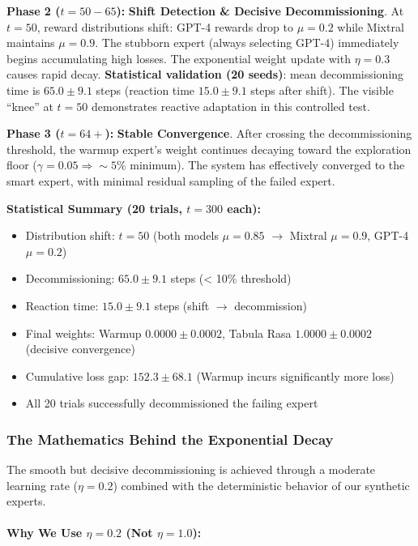 \textbf{Phase 2 ($t=50-65$):} \textbf{Shift Detection \& Decisive Decommissioning}. At $t=50$, reward distributions shift: GPT-4 rewards drop to $\mu=0.2$ while Mixtral maintains $\mu=0.9$. The stubborn expert (always selecting GPT-4) immediately begins accumulating high losses. The exponential weight update with $\eta=0.3$ causes rapid decay. \textbf{Statistical validation (20 seeds)}: mean decommissioning time is $65.0 \pm 9.1$ steps (reaction time $15.0 \pm 9.1$ steps after shift). The visible ``knee'' at $t=50$ demonstrates reactive adaptation in this controlled test.

\textbf{Phase 3 ($t=64+$):} \textbf{Stable Convergence}. After crossing the decommissioning threshold, the warmup expert's weight continues decaying toward the exploration floor ($\gamma=0.05 \Rightarrow \sim 5\%$ minimum). The system has effectively converged to the smart expert, with minimal residual sampling of the failed expert.

\textbf{Statistical Summary (20 trials, $t=300$ each):}
\begin{itemize}
    \item Distribution shift: $t=50$ (both models $\mu=0.85$ $\to$ Mixtral $\mu=0.9$, GPT-4 $\mu=0.2$)
    \item Decommissioning: $65.0 \pm 9.1$ steps (< 10\% threshold)
    \item Reaction time: $15.0 \pm 9.1$ steps (shift $\to$ decommission)
    \item Final weights: Warmup $0.0000 \pm 0.0002$, Tabula Rasa $1.0000 \pm 0.0002$ (decisive convergence)
    \item Cumulative loss gap: $152.3 \pm 68.1$ (Warmup incurs significantly more loss)
    \item All 20 trials successfully decommissioned the failing expert
\end{itemize}

\subsubsection{The Mathematics Behind the Exponential Decay}

The smooth but decisive decommissioning is achieved through a moderate learning rate ($\eta=0.2$) combined with the deterministic behavior of our synthetic experts.

\paragraph{Why We Use $\eta=0.2$ (Not $\eta=1.0$):}

